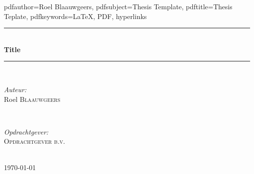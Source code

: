 \documentclass[12pt]{article} %
\begin{document}
\hypersetup
{
    pdfauthor={Roel Blaauwgeers},
    pdfsubject={Thesis Template},
    pdftitle={Thesis Teplate},
    pdfkeywords={LaTeX, PDF, hyperlinks}
}


\begin{titlepage}

\newcommand{\HRule}{\rule{\linewidth}{0.5mm}} %

\center %

\HRule \\[0.4cm]
{ \huge \bfseries Title}\\[0.4cm]
\HRule \\[1.5cm]

\begin{minipage}{0.4\textwidth}
\begin{flushleft} \large
\emph{Auteur:}\\
Roel \textsc{Blaauwgeers}
\end{flushleft}
\end{minipage}
~
\begin{minipage}{0.4\textwidth}
\begin{flushright} \large
\emph{Opdrachtgever:} \\
 \textsc{Opdrachtgever b.v.}
\end{flushright}
\end{minipage}\\[4cm]

{\large \today}\\[3cm] 

\vfill %

\end{titlepage}

\tableofcontents %


\let\stdsection\section  
\renewcommand\section{\newpage\stdsection}   
\flushleft
\end{document}
